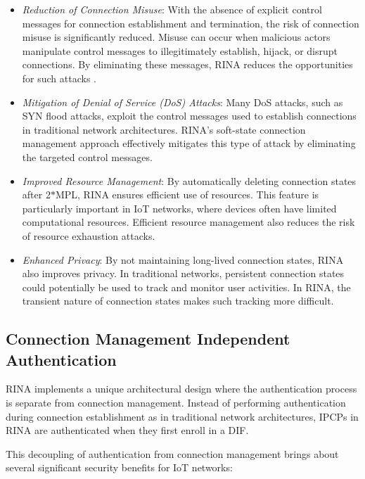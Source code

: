 \documentclass{ieeeaccess}
\begin{document}
\begin{itemize}
	\item \textit{Reduction of Connection Misuse}: With the absence of explicit control messages for connection establishment and termination, the risk of connection misuse is significantly reduced. Misuse can occur when malicious actors manipulate control messages to illegitimately establish, hijack, or disrupt connections. By eliminating these messages, RINA reduces the opportunities for such attacks \cite{boddapati2012assessing}.
	\item \textit{Mitigation of Denial of Service (DoS) Attacks}: Many DoS attacks, such as SYN flood attacks, exploit the control messages used to establish connections in traditional network architectures. RINA's soft-state connection management approach effectively mitigates this type of attack by eliminating the targeted control messages.
	\item \textit{Improved Resource Management}: By automatically deleting connection states after 2$*$MPL, RINA ensures efficient use of resources. This feature is particularly important in IoT networks, where devices often have limited computational resources. Efficient resource management also reduces the risk of resource exhaustion attacks.
	\item \textit{Enhanced Privacy}: By not maintaining long-lived connection states, RINA also improves privacy. In traditional networks, persistent connection states could potentially be used to track and monitor user activities. In RINA, the transient nature of connection states makes such tracking more difficult.
\end{itemize}

\subsection{Connection Management Independent Authentication}
RINA implements a unique architectural design where the authentication process is separate from connection management. Instead of performing authentication during connection establishment as in traditional network architectures, IPCPs in RINA are authenticated when they first enroll in a DIF.

This decoupling of authentication from connection management brings about several significant security benefits for IoT networks:
\end{document}
